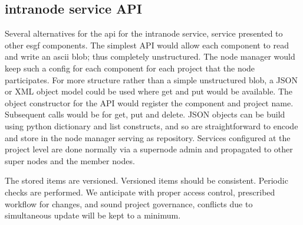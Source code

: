 \documentclass[oneside,12pt]{memoir}
\begin{document}
\subsection{intranode service API}

Several alternatives for the api for the intranode service, service presented to other esgf components.   The simplest API would allow each component to read and write an ascii blob; thus completely unstructured.  The node manager would keep such a config for each component for each project that the node participates.  For more structure rather than a simple unstructured blob, a JSON or XML object model could be used where get and put would be available.   The object constructor for the API would register the component and project name.  Subsequent calls would be for get, put and delete.  JSON objects can be build using python dictionary and list constructs, and so are straightforward to encode and store in the node manager serving as repository.   Services configured at the project level are done normally via a supernode admin and propagated to other super nodes and the member nodes.

The stored items are versioned.  Versioned items should be consistent.  Periodic checks are performed.  We anticipate with proper access control, prescribed workflow for changes, and sound project governance, conflicts due to simultaneous update will be kept to a minimum.
\end{document}
